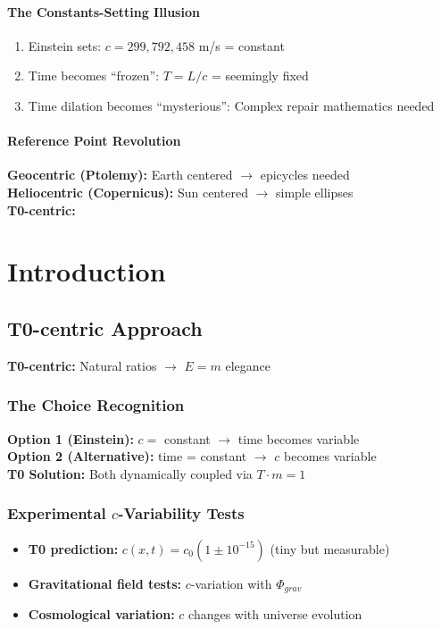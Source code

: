 \documentclass[12pt,a4paper]{report}
\begin{document}
	\subsubsection{The Constants-Setting Illusion}
	\begin{enumerate}
		\item Einstein sets: $c = 299{,}792{,}458$ m/s = constant
		\item Time becomes ``frozen'': $T = L/c$ = seemingly fixed
		\item Time dilation becomes ``mysterious'': Complex repair mathematics needed
	\end{enumerate}
	
	\subsubsection{Reference Point Revolution}
	\textbf{Geocentric (Ptolemy):} Earth centered $\rightarrow$ epicycles needed\\
	\textbf{Heliocentric (Copernicus):} Sun centered $\rightarrow$ simple ellipses\\
	\textbf{T0-centric:}
	\chapter{Introduction}
	
	\section{T0-centric Approach}
	\textbf{T0-centric:} Natural ratios $\rightarrow$ $E = m$ elegance
	
	\subsection{The Choice Recognition}
	\textbf{Option 1 (Einstein):} $c =$ constant $\rightarrow$ time becomes variable\\
	\textbf{Option 2 (Alternative):} time = constant $\rightarrow$ $c$ becomes variable\\
	\textbf{T0 Solution:} Both dynamically coupled via $T \cdot m = 1$
	
	\subsection{Experimental $c$-Variability Tests}
	\begin{itemize}
		\item \textbf{T0 prediction:} $c(x,t) = c_0(1 \pm 10^{-15})$ (tiny but measurable)
		\item \textbf{Gravitational field tests:} $c$-variation with $\Phi_{grav}$
		\item \textbf{Cosmological variation:} $c$ changes with universe evolution
	\end{itemize}
	
\end{document}
